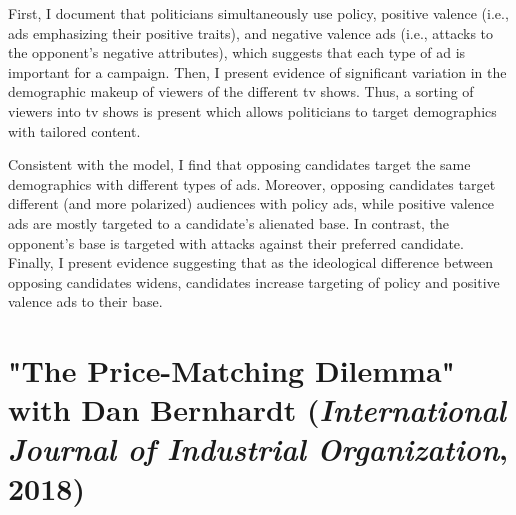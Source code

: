 \documentclass[12pt]{article}
\begin{document}
First, I document that politicians simultaneously use policy, positive valence (i.e., ads emphasizing their positive traits), and negative valence ads (i.e., attacks to the opponent's negative attributes),
which suggests that each type of ad is important for a campaign.
Then, I present evidence of significant variation in the demographic makeup of viewers of the different tv shows.
Thus, a sorting of viewers into tv shows is present which allows politicians to target demographics with tailored content.

Consistent with the model, I find that opposing candidates target the same demographics with different types of ads.
Moreover, opposing candidates target different (and more polarized) audiences with policy ads, while positive valence ads are mostly targeted to a candidate’s alienated base.
In contrast, the opponent's base is targeted with attacks against their preferred candidate.
Finally, I present evidence suggesting that as the ideological difference between opposing candidates widens,
candidates increase targeting of policy and positive valence ads to their base.






\clearpage
\section{"The Price-Matching Dilemma" with Dan Bernhardt (\emph{International Journal of Industrial Organization}, 2018)}
\label{sec:orgf0aaf60}
\vspace{0.25cm}
\end{document}
